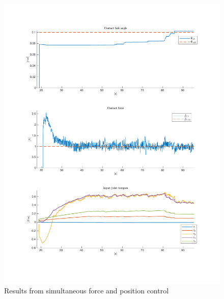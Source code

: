 \begin{figure}
    \centering
    \includegraphics[trim=2.1cm 2.1cm 2.1cm 2.1cm, clip=true, width=\textwidth]{figures/experiments/pos+f/pf-ref-3.pdf}
    \caption{Results from simultaneous force and position control}
    \label{fig:p+f}
\end{figure}